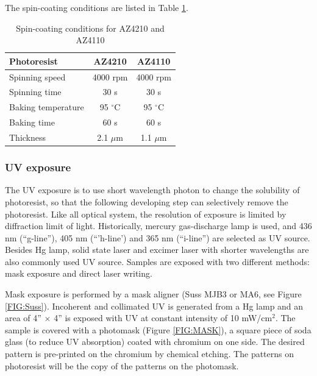 \documentclass[pdflatex, sectionletters, 12pt]{pittetd}    %
\begin{document}
The spin-coating conditions are listed in Table \ref{tab:photoresistsCoating}.

\begin{table}
	\centering
	\begin{tabular}{l|cc}
		\hline
		Photoresist	&	AZ4210	&	AZ4110 \\ \hline
		Spinning speed	&	4000 rpm	& 4000 rpm	\\ 
		Spinning time	&	30 s	&	30 s	\\
		Baking temperature	&	95 $^{\circ}$C	&	95 $^{\circ}$C \\ 
		Baking time	&	60 s	&	60 s	\\
		Thickness	&	2.1 $\mu$m	&	1.1 $\mu$m \\ \hline
	\end{tabular}
	\caption{Spin-coating conditions for AZ4210 and AZ4110}
	\label{tab:photoresistsCoating}

\end{table}


\subsubsection{UV exposure}

The UV exposure is to use short wavelength photon to change the solubility of photoresist, so that the following developing step can selectively remove the photoresist. Like all optical system, the resolution of exposure is limited by diffraction limit of light. Historically, mercury gas-discharge lamp is used, and 436 nm (``g-line''), 405 nm (``'h-line') and 365 nm (``i-line'') are selected as UV source. Besides Hg lamp, solid state laser and excimer laser with shorter wavelengths are also commonly used UV source. Samples are exposed with two different methods: mask exposure and direct laser writing. 

Mask exposure is performed by a mask aligner (Suss MJB3 or MA6, see Figure \ref{FIG:Suss}). Incoherent and collimated UV is generated from a Hg lamp and an area of 4'' $\times$ 4'' is exposed with UV at constant intensity of 10 mW/cm$^2$. The sample is covered with a photomask (Figure \ref{FIG:MASK}), a square piece of soda glass (to reduce UV absorption) coated with chromium on one side. The desired pattern is pre-printed on the chromium by chemical etching. The patterns on photoresist will be the copy of the patterns on the photomask. 
\end{document}
